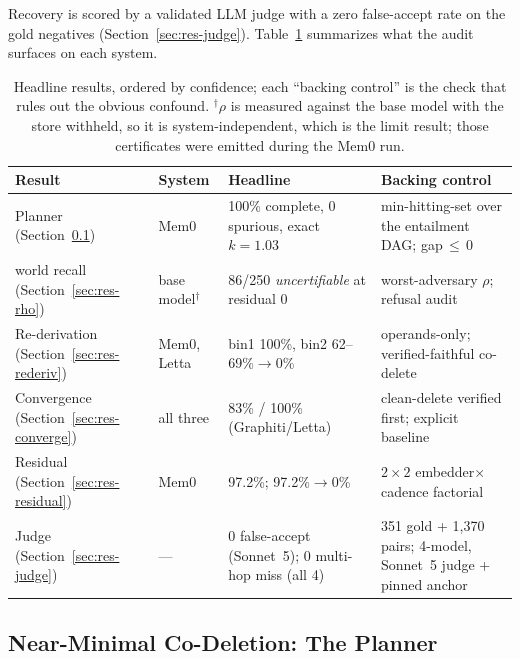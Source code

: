 \documentclass[letterpaper]{article}
\begin{document}
Recovery is scored by a validated LLM judge \citep{zheng2023judge} with a zero
false-accept rate on the gold negatives (Section~\ref{sec:res-judge}).
Table~\ref{tab:master} summarizes what the audit surfaces on each system.
\begin{table}[t]
\centering
\small
\begin{tabular}{@{}llll@{}}
\toprule
\textbf{Result} & \textbf{System} & \textbf{Headline} & \textbf{Backing control} \\
\midrule
Planner (Section~\ref{sec:res-planner})        & Mem0     & 100\% complete, 0 spurious, exact $k{=}1.03$ & min-hitting-set over the entailment DAG; gap$\,{\le}\,0$ \\
world recall (Section~\ref{sec:res-rho})       & base model$^\dagger$ & 86/250 \emph{uncertifiable} at residual $0$ & worst-adversary $\rho$; refusal audit \\
Re-derivation (Section~\ref{sec:res-rederiv})  & Mem0, Letta & bin1 100\%, bin2 62--69\%$\to$0\% & operands-only; verified-faithful co-delete \\
Convergence (Section~\ref{sec:res-converge})   & all three & 83\% / 100\% (Graphiti/Letta) & clean-delete verified first; explicit baseline \\
Residual (Section~\ref{sec:res-residual})      & Mem0     & 97.2\%; 97.2\%$\to$0\% & $2{\times}2$ embedder$\times$cadence factorial \\
Judge (Section~\ref{sec:res-judge})            & ---      & 0 false-accept (Sonnet~5); 0 multi-hop miss (all 4) & 351 gold + 1{,}370 pairs; 4-model, Sonnet~5 judge + pinned anchor \\
\bottomrule
\end{tabular}
\caption{Headline results, ordered by confidence; each ``backing control'' is the
check that rules out the obvious confound. $^\dagger$$\rho$ is measured against the
base model with the store withheld, so it is system-independent, which is the limit
result; those certificates were emitted during the Mem0 run.}
\label{tab:master}
\end{table}

\subsection{Near-Minimal Co-Deletion: The Planner}\label{sec:res-planner}
\end{document}
